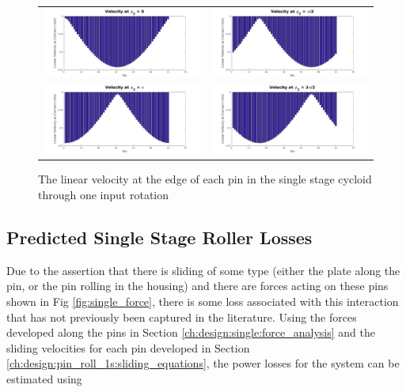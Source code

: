 \begin{figure}[!b]
   \centering
   \begin{tabular}{cc}
	   \includegraphics[width=0.48\linewidth]{fig/single_vel_0pi} &
	   \includegraphics[width=0.48\linewidth]{fig/single_vel_pi_2} \\
	   \includegraphics[width=0.48\linewidth]{fig/single_vel_pi} &
	   \includegraphics[width=0.48\linewidth]{fig/single_vel_3pi2}
   \end{tabular}
   \caption{The linear velocity at the edge of each pin in the single stage cycloid through one input rotation}
   \label{fig:single_sliding}
\end{figure}

\subsection{Predicted Single Stage Roller Losses} \label{ch:design:pin_roll_1s:predicted_losses}

Due to the assertion that there is sliding of some type (either the plate along the pin, or the pin rolling in the housing) and there are forces acting on these pins shown in Fig \ref{fig:single_force}, there is some loss associated with this interaction that has not previously been captured in the literature. Using the forces developed along the pins in Section \ref{ch:design:single:force_analysis} and the sliding velocities for each pin developed in Section \ref{ch:design:pin_roll_1s:sliding_equations}, the power losses for the system can be estimated using 


